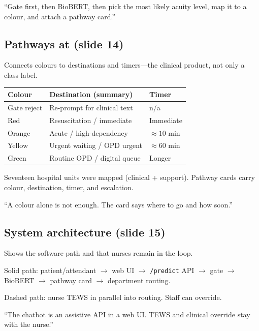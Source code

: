 \begin{saybox}
``Gate first, then BioBERT, then pick the most likely acuity level, map it to a colour, and attach a pathway card.''
\end{saybox}

\subsection{Pathways at \examplehospital{} (slide 14)}

\begin{whybox}
Connects colours to destinations and timers---the clinical product, not only a class label.
\end{whybox}

\begin{center}
\small
\begin{tabular}{@{}lll@{}}
\toprule
Colour & Destination (summary) & Timer \\
\midrule
Gate reject & Re-prompt for clinical text & n/a \\
Red & Resuscitation / immediate & Immediate \\
Orange & Acute / high-dependency & \(\approx 10\) min \\
Yellow & Urgent waiting / OPD urgent & \(\approx 60\) min \\
Green & Routine OPD / digital queue & Longer \\
\bottomrule
\end{tabular}
\end{center}

Seventeen hospital units were mapped (clinical + support). Pathway cards carry colour, destination, timer, and escalation.

\begin{saybox}
``A colour alone is not enough. The card says where to go and how soon.''
\end{saybox}

\subsection{System architecture (slide 15)}

\begin{whybox}
Shows the software path and that nurses remain in the loop.
\end{whybox}

Solid path: patient/attendant \(\to\) web UI \(\to\) \texttt{/predict} API \(\to\) gate \(\to\) BioBERT
\(\to\) pathway card \(\to\) department routing.

Dashed path: nurse TEWS in parallel into routing. Staff can override.

\begin{saybox}
``The chatbot is an assistive API in a web UI. TEWS and clinical override stay with the nurse.''
\end{saybox}
